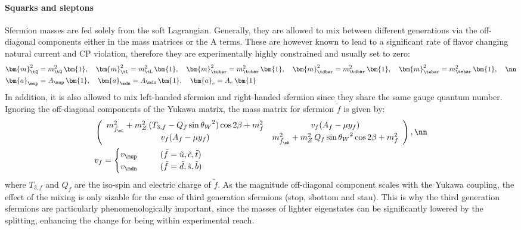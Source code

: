 \paragraph{Squarks and sleptons}
Sfermion masses are fed solely from the soft Lagrangian. Generally, they are allowed to mix between different generations via the off-diagonal components either in the mass matrices or the A terms. These are however known to lead to a significant rate of flavor changing natural current and CP violation, therefore they are experimentally highly constrained and usually set to zero:
\begin{align}
&  \bm{m}^2_{\tQ}    = m^2_{\tQ} \,    \bm{1}, \,\,\,\,\,\,
  \bm{m}_{\tL}^2    = m_{\tL}^2 \,    \bm{1}, \,\,\,\,\,\,
  \bm{m}_{\tubar}^2 = m_{\tubar}^2 \, \bm{1}, \,\,\,\,\,\,
  \bm{m}_{\tdbar}^2 = m_{\tdbar}^2 \, \bm{1}, \,\,\,\,\,\,
  \bm{m}_{\tebar}^2 = m_{\tebar}^2 \, \bm{1}, \,\,\,\,\,\, \nn \\
%
& \bm{a}_\mup = A_\mup \, \bm{1}, \,\,\,\,\,\,
  \bm{a}_\mdn = A_\mdn \, \bm{1}, \,\,\,\,\,\,
  \bm{a}_e    = A_e \, \bm{1}
\end{align}
In addition, it is also allowed to mix left-handed sfermion and right-handed sfermion since they share the same gauge quantum number. Ignoring the off-diagonal components of the Yukawa matrix, the mass matrix for sfermion $\tilde{f}$ is given by:
\begin{align}
& \left(  
  \begin{array}{cc}
    m^2_{\tilde{f}_{\mL}} + m_Z^2 \,(T_{3,f}-Q_f\sin{\theta_W}^2) \cos{2\beta} + m^2_f    &  v_f ( A_f - \mu y_f)         \\
    v_f ( A_f - \mu y_f)                &     m^2_{\tilde{f}_{\mR}} + m_Z^2 \, Q_f\sin{\theta_W}^2\cos{2\beta} + m^2_f    
  \end{array} 
\right), \nn  \\
%
& v_f = \begin{cases}
  v_{\mup} \mbox{\phantom{MMM}} (\tilde{f}=\tilde{u}, \tilde{c}, \tilde{t}) \\
  v_{\mdn} \mbox{\phantom{MMM}} (\tilde{f}=\tilde{d}, \tilde{s}, \tilde{b}) 
     \end{cases}
%
\end{align}
where $T_{3,f}$ and $Q_f$ are the iso-spin and electric charge of $\tilde{f}$. As the magnitude off-diagonal component scales with the Yukawa coupling, the effect of the mixing is only sizable for the case of third generation sfermions (stop, sbottom and stau).
This is why the third generation sfermions are particularly phenomenologically important,   
since the masses of lighter eigenstates can be significantly lowered by the splitting, enhancing the change for being within experimental reach.  \\



